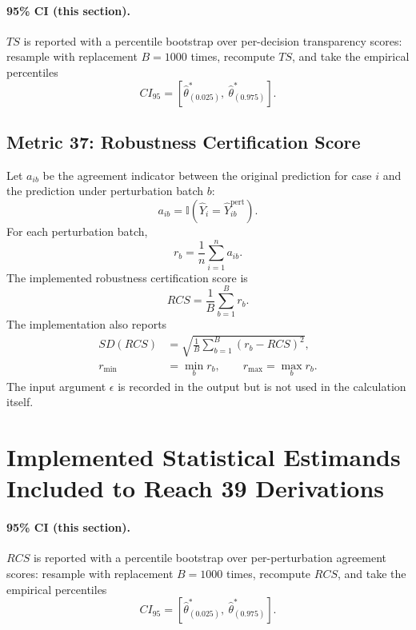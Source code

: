 \documentclass[11pt]{article}
\newcommand{\ind}{\mathbb{I}}
\begin{document}
\paragraph{95\% CI (this section).} $TS$ is reported with a percentile bootstrap over per-decision transparency scores: resample with replacement $B=1000$ times, recompute $TS$, and take the empirical percentiles
\begin{equation}
CI_{95}=\left[\hat\theta^{\ast}_{(0.025)},\ \hat\theta^{\ast}_{(0.975)}\right].
\end{equation}

\subsection{Metric 37: Robustness Certification Score}

Let $a_{ib}$ be the agreement indicator between the original prediction for
case $i$ and the prediction under perturbation batch $b$:
\begin{equation}
a_{ib}=\ind(\hat Y_i=\hat Y_{ib}^{\mathrm{pert}}).
\end{equation}
For each perturbation batch,
\begin{equation}
r_b=\frac{1}{n}\sum_{i=1}^{n}a_{ib}.
\end{equation}
The implemented robustness certification score is
\begin{equation}
RCS=\frac{1}{B}\sum_{b=1}^{B}r_b.
\end{equation}
The implementation also reports
\begin{align}
SD(RCS) &= \sqrt{\frac{1}{B}\sum_{b=1}^{B}(r_b-RCS)^2},\\
r_{\min} &= \min_b r_b,\qquad r_{\max}=\max_b r_b.
\end{align}
The input argument $\epsilon$ is recorded in the output but is not used in the
calculation itself.

\section{Implemented Statistical Estimands Included to Reach 39 Derivations}


\paragraph{95\% CI (this section).} $RCS$ is reported with a percentile bootstrap over per-perturbation agreement scores: resample with replacement $B=1000$ times, recompute $RCS$, and take the empirical percentiles
\begin{equation}
CI_{95}=\left[\hat\theta^{\ast}_{(0.025)},\ \hat\theta^{\ast}_{(0.975)}\right].
\end{equation}
\end{document}
